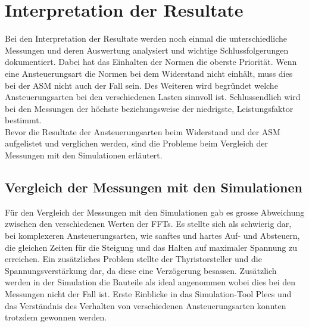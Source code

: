 \section{Interpretation der Resultate}\label{sec:Interpretation_Resultate}
Bei den Interpretation der Resultate werden noch einmal die unterschiedliche Messungen und deren Auswertung analysiert und wichtige Schlussfolgerungen dokumentiert. Dabei hat das Einhalten der Normen die oberste Priorität. Wenn eine Ansteuerungsart die Normen bei dem Widerstand nicht einhält, muss dies bei der ASM nicht auch der Fall sein. Des Weiteren wird begründet welche Ansteuerungsarten bei den verschiedenen Lasten sinnvoll ist. Schlussendlich wird bei den Messungen der höchste beziehungsweise der niedrigste, Leistungsfaktor bestimmt.\\
Bevor die Resultate der Ansteuerungsarten beim Widerstand und der ASM aufgelistet und verglichen werden, sind die Probleme beim Vergleich der Messungen mit den Simulationen erläutert.

\subsection{Vergleich der Messungen mit den Simulationen}
Für den Vergleich der Messungen mit den Simulationen gab es grosse Abweichung zwischen den verschiedenen Werten der FFTs. Es stellte sich als schwierig dar, bei komplexeren Ansteuerungsarten, wie sanftes und hartes Auf- und Absteuern, die gleichen Zeiten für die Steigung und das Halten auf maximaler Spannung zu erreichen. Ein zusätzliches Problem stellte der Thyristorsteller und die Spannungsverstärkung dar, da diese eine Verzögerung besassen. Zusätzlich werden in der Simulation die Bauteile als ideal angenommen wobei dies bei den Messungen nicht der Fall ist. Erste Einblicke in das Simulation-Tool Plecs und das Verständnis des Verhalten von verschiedenen Ansteuerungsarten konnten trotzdem gewonnen werden. 


